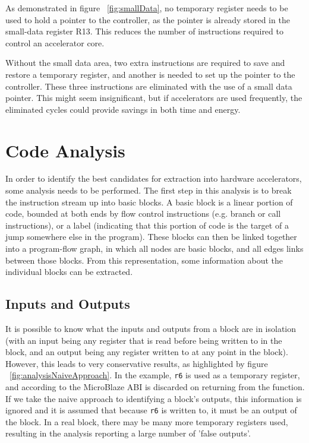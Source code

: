\documentclass{UoYCSproject}
\begin{document}
As demonstrated in figure ~\ref{fig:smallData}, no temporary register needs to be used to hold a
pointer to the controller, as the pointer is already stored in the small-data register R13.
This reduces the number of instructions required to control an accelerator core.

Without the small data area, two extra instructions are required to save and restore a temporary register,
and another is needed to set up the pointer to the controller. These three instructions are eliminated with the use of a small
data pointer. This might seem insignificant, but if accelerators are used frequently, the eliminated cycles could provide
savings in both time and energy.

\section{Code Analysis}

In order to identify the best candidates for extraction into hardware accelerators, some analysis needs to be performed.
The first step in this analysis is to break the instruction stream up into basic blocks. A basic block is a linear portion of
code, bounded at both ends by flow control instructions (e.g. branch or call instructions), or a label (indicating that this
portion of code is the target of a jump somewhere else in the program). These blocks can then be linked
together into a program-flow graph, in which all nodes are basic blocks, and all edges links between those blocks.
From this representation, some information about the individual blocks can be extracted.

\subsection{Inputs and Outputs}

It is possible to know what the inputs and outputs from a block are in isolation (with an input being any register that is read
before being written to in the block, and an output being any register written to at any point in the block). However, this leads
to very conservative results, as highlighted by figure ~\ref{fig:analysisNaiveApproach}. In the example, \texttt{r6} is used as a
temporary register, and according to the MicroBlaze ABI \cite{microblaze-ref} is discarded on returning from the function. If we
take the naive approach to identifying a block's outputs, this information is ignored and it is assumed that because \texttt{r6}
is written to, it must be an output of the block. In a real block, there may be many more temporary registers used, resulting in
the analysis reporting a large number of 'false outputs'.
\end{document}
